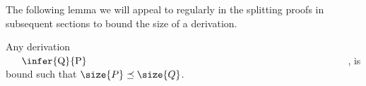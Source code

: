 \documentclass[UKenglish,acmsmall,authorversion]{acmart}
\theoremstyle{plain}
\begin{document}
{The following lemma we will appeal to regularly in the splitting proofs in subsequent sections to bound the size of a derivation.
\begin{lemma}[affine]\label{lemma:bound}
Any derivation $\vcenter{\infer{Q}{P}}$, is bound such that $\size{P} \preceq \size{Q}$.
\end{lemma}
%
%
%
%
%
%
%
%
}
\end{document}
